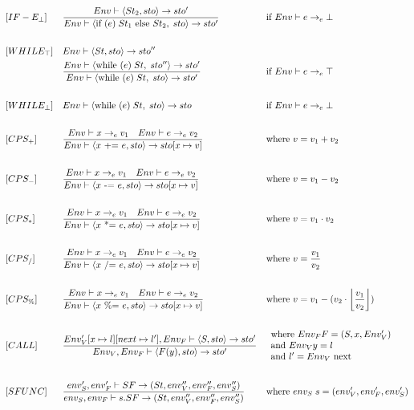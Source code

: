 \begin{align*}
%
&[IF-E_\bot] & &\frac{Env \vdash \langle St_2, sto \rangle \rightarrow sto^\prime}{Env \vdash \langle \text{if } (e)\; St_1 \text{ else } St_2,\; sto \rangle \rightarrow sto^\prime} & &\text{if } Env \vdash e \rightarrow_e \bot\\\\
%
&[WHILE_\top] & &Env \vdash \langle St, sto \rangle \rightarrow sto^{\prime\prime}\\
& & &\frac{Env \vdash \langle \text{while } (e)\; St,\; sto^{\prime\prime} \rangle \rightarrow sto^\prime}{Env \vdash \langle \text{while } (e)\; St,\; sto \rangle \rightarrow sto^\prime} & &\text{if } Env \vdash e \rightarrow_e \top\\\\
%
&[WHILE_\bot] & &Env \vdash \langle \text{while } (e)\; St,\; sto \rangle \rightarrow sto & &\text{if } Env \vdash e \rightarrow_e \bot\\\\
&[CPS_+] & &\frac{Env \vdash x \rightarrow_e v_1 \quad Env \vdash e \rightarrow_e v_2}{Env \vdash \langle x \text{ += } e, sto \rangle \rightarrow sto[x \mapsto v]} & &\text{where } v = v_1 + v_2\\\\
%
&[CPS_-] & &\frac{Env \vdash x \rightarrow_e v_1 \quad Env \vdash e \rightarrow_e v_2}{Env \vdash \langle x \text{ -= } e, sto \rangle \rightarrow sto[x \mapsto v]} & &\text{where } v = v_1 - v_2\\\\
%
&[CPS_*] & &\frac{Env \vdash x \rightarrow_e v_1 \quad Env \vdash e \rightarrow_e v_2}{Env \vdash \langle x \text{ *= } e, sto \rangle \rightarrow sto[x \mapsto v]} & &\text{where } v = v_1 \cdot v_2\\\\
%
&[CPS_/] & &\frac{Env \vdash x \rightarrow_e v_1 \quad Env \vdash e \rightarrow_e v_2}{Env \vdash \langle x \text{ /= } e, sto \rangle \rightarrow sto[x \mapsto v]} & &\text{where } v = \frac{v_1}{v_2}\\\\
%
&[CPS_\%] & &\frac{Env \vdash x \rightarrow_e v_1 \quad Env \vdash e \rightarrow_e v_2}{Env \vdash \langle x \text{ \%= } e, sto \rangle \rightarrow sto[x \mapsto v]} & &\text{where } v = v_1 - (v_2 \cdot \floor*{\frac{v_1}{v_2}})\\\\
%
&[CALL] & & \frac{Env^\prime_V[x\mapsto l][next\mapsto l^\prime], Env_F\vdash\langle S, sto\rangle\to sto^\prime}{Env_V, Env_F\vdash\langle F(y), sto\rangle\to sto^\prime} & 
&\begin{array}{l}
    \text{where } Env_F F = (S, x, Env^\prime_V)\\
    \text{and } Env_V y = l\\
    \text{and } l^\prime=Env_V \text{ next}
\end{array} \\\\
&[SFUNC] & &\frac{env_S^\prime, env_F^\prime \vdash SF \rightarrow (St, env_V^{\prime\prime}, env_F^{\prime\prime}, env_S^{\prime\prime})}{env_S, env_F \vdash s.SF \rightarrow (St, env_V^{\prime\prime}, env_F^{\prime\prime}, env_S^{\prime\prime})} & &\text{where } env_S\; s = (env_V^\prime, env_F^\prime, env_S^\prime)
\end{align*}